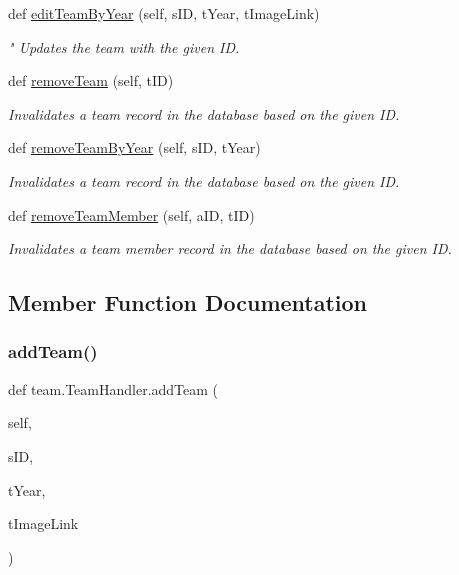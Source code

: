 \begin{DoxyCompactItemize}
def \hyperlink{classteam_1_1_team_handler_af700a4d0c3eaf91489450743ce0ebba2}{edit\+Team\+By\+Year} (self, s\+ID, t\+Year, t\+Image\+Link)
\begin{DoxyCompactList}\small\item\em " Updates the team with the given ID. \end{DoxyCompactList}\item 
def \hyperlink{classteam_1_1_team_handler_a7cc8136e302248a1ddcdef5c2d099de5}{remove\+Team} (self, t\+ID)
\begin{DoxyCompactList}\small\item\em Invalidates a team record in the database based on the given ID. \end{DoxyCompactList}\item 
def \hyperlink{classteam_1_1_team_handler_abf03ca844675d071f4afcbaaf098deb7}{remove\+Team\+By\+Year} (self, s\+ID, t\+Year)
\begin{DoxyCompactList}\small\item\em Invalidates a team record in the database based on the given ID. \end{DoxyCompactList}\item 
def \hyperlink{classteam_1_1_team_handler_ac1bc3a20efbfd07fe3796fa5880b26ba}{remove\+Team\+Member} (self, a\+ID, t\+ID)
\begin{DoxyCompactList}\small\item\em Invalidates a team member record in the database based on the given ID. \end{DoxyCompactList}\end{DoxyCompactItemize}


\subsection{Member Function Documentation}
\mbox{\label{classteam_1_1_team_handler_a6bf3721236cf70ddb4e831e9024d4ba1}} 
\subsubsection{\texorpdfstring{add\+Team()}{addTeam()}}
{\footnotesize\ttfamily def team.\+Team\+Handler.\+add\+Team (\begin{DoxyParamCaption}\item[{}]{self,  }\item[{}]{s\+ID,  }\item[{}]{t\+Year,  }\item[{}]{t\+Image\+Link }\end{DoxyParamCaption})}



